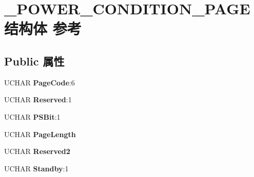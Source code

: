 \hypertarget{struct___p_o_w_e_r___c_o_n_d_i_t_i_o_n___p_a_g_e}{}\section{\+\_\+\+P\+O\+W\+E\+R\+\_\+\+C\+O\+N\+D\+I\+T\+I\+O\+N\+\_\+\+P\+A\+G\+E结构体 参考}
\label{struct___p_o_w_e_r___c_o_n_d_i_t_i_o_n___p_a_g_e}
\subsection*{Public 属性}
\begin{DoxyCompactItemize}
\item 
\mbox{\label{struct___p_o_w_e_r___c_o_n_d_i_t_i_o_n___p_a_g_e_a6a5f5c4861fc635f87a090c900259763}} 
U\+C\+H\+AR {\bfseries Page\+Code}\+:6
\item 
\mbox{\label{struct___p_o_w_e_r___c_o_n_d_i_t_i_o_n___p_a_g_e_a9e442025397c284502b0d8a584d64e92}} 
U\+C\+H\+AR {\bfseries Reserved}\+:1
\item 
\mbox{\label{struct___p_o_w_e_r___c_o_n_d_i_t_i_o_n___p_a_g_e_a7e2944d2764995ba1771888a811e465f}} 
U\+C\+H\+AR {\bfseries P\+S\+Bit}\+:1
\item 
\mbox{\label{struct___p_o_w_e_r___c_o_n_d_i_t_i_o_n___p_a_g_e_a16e0395a85b3d5d35b2961f88170e398}} 
U\+C\+H\+AR {\bfseries Page\+Length}
\item 
\mbox{\label{struct___p_o_w_e_r___c_o_n_d_i_t_i_o_n___p_a_g_e_ad39feed8eba0ad62fd89e7a35a291816}} 
U\+C\+H\+AR {\bfseries Reserved2}
\item 
\mbox{\label{struct___p_o_w_e_r___c_o_n_d_i_t_i_o_n___p_a_g_e_a4ec95a37ceb9be525586e3b3dbbc7e31}} 
U\+C\+H\+AR {\bfseries Standby}\+:1
\item 
\mbox{\label{struct___p_o_w_e_r___c_o_n_d_i_t_i_o_n___p_a_g_e_ae107b76fbb1432fb357f1016ef0ceaf4}} 

\end{DoxyCompactItemize}
